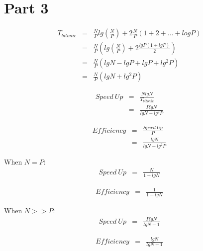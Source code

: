 \documentclass[a4paper,12pt]{article}
\begin{document}
\section*{Part 3}
    \begin{eqnarray}
        T_{bitonic} & = & \frac{N}{P} lg(\frac{N}{P}) + 2 \frac{N}{P} (1 + 2 + ...+ log P)\\
                    & = & \frac{N}{P} (lg(\frac{N}{P}) + 2 \frac{lg P ( 1 + lg P)}{2}) \\
                    & = & \frac{N}{P} ( lg N - lg P + lg P + lg^2 P)\\
                    & = & \frac{N}{P} (lg N + lg^2 P)
    \end{eqnarray}

    \begin{eqnarray}
        Speed\ Up & = & \frac{N lg N}{T_{bitonic}} \\
                  & = & \frac{P lg N}{lg N + lg^2 P}
    \end{eqnarray}

    \begin{eqnarray}
        Efficiency & = & \frac{Speed\ Up}{P}\\
                   & = & \frac{lg N}{lg N + lg^2 P}
    \end{eqnarray}

    When $N=P$:
    \begin{eqnarray}
        Speed\ Up & = & \frac{N}{1 + lg N}
    \end{eqnarray}

    \begin{eqnarray}
        Efficiency & = & \frac{1}{1 + lg N}
    \end{eqnarray}

    When $N >> P$:
    \begin{eqnarray}
        Speed\ Up & = & \frac{P lg N}{lg N + 1}
    \end{eqnarray}

    \begin{eqnarray}
        Efficiency & = & \frac{lg N}{lg N + 1}
    \end{eqnarray}
\end{document}
